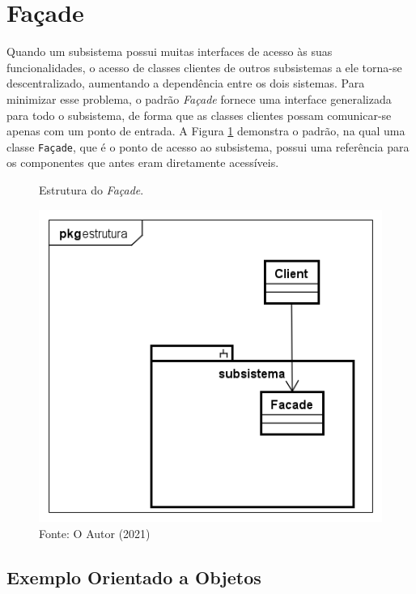\section{Façade}

Quando um subsistema possui muitas interfaces 
de acesso às suas funcionalidades, o acesso de 
classes clientes de outros subsistemas a ele 
torna-se descentralizado, aumentando a dependência 
entre os dois sistemas. Para minimizar esse problema, 
o padrão \textit{Façade} fornece uma interface generalizada 
para todo o subsistema, de forma que as classes 
clientes possam comunicar-se apenas com um ponto 
de entrada. A Figura \ref{facade_struct} demonstra 
o padrão, na qual uma classe \texttt{Façade}, que é o ponto de 
acesso ao subsistema, possui uma referência para 
os componentes que antes eram diretamente acessíveis.\cite{gamma:1995}

\begin{figure}[htb]
	\caption{\label{facade_struct}Estrutura do \textit{Façade}.}
	\begin{center}
	    \includegraphics[scale=0.4]{5_padroes-contexto-funcional/5.2_estruturais/5.2.5_facade/facade_estrutura.png}
	\end{center}
  \caption*{Fonte: O Autor (2021)}
\end{figure}

\subsection*{Exemplo Orientado a Objetos}

